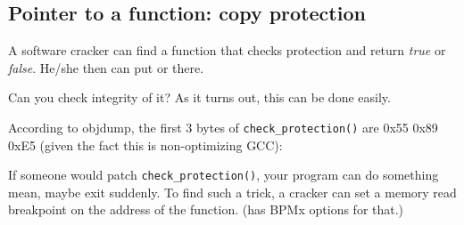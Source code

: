 \subsection{Pointer to a function: copy protection}
\myindex{\SoftwareCracking}

A software cracker can find a function that checks protection and return \emph{true} or \emph{false}.
He/she then can put  or  there.

Can you check integrity of it?
As it turns out, this can be done easily.

According to objdump, the first 3 bytes of \verb|check_protection()| are 0x55 0x89 0xE5 (given the fact this is non-optimizing GCC):





If someone would patch \verb|check_protection()|, your program can do something mean, maybe exit suddenly.
To find such a trick, a cracker can set a memory read breakpoint on the address of the function.
(\tracer has BPMx options for that.)


